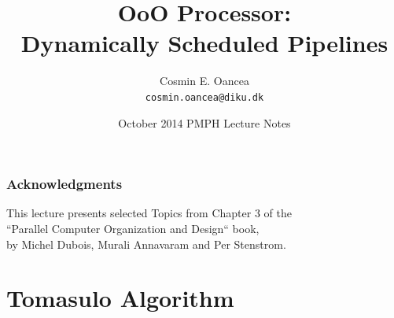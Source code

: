 \documentclass{beamer}
\title[OoO Processor]{OoO Processor:\\Dynamically Scheduled Pipelines}
\author[C.~Oancea]{Cosmin E. Oancea\\{\tt cosmin.oancea@diku.dk}}
\institute{Department of Computer Science (DIKU)\\University of Copenhagen}
\date[Sept 2014]{October 2014 PMPH Lecture Notes}
\begin{document}
\titleslide



\begin{frame}
\frametitle{Acknowledgments}
This lecture presents selected Topics from Chapter 3 of the\\
``Parallel Computer Organization and Design`` book,\\
by Michel Dubois, Murali Annavaram and Per Stenstrom.
\end{frame}

\begin{frame}[fragile]
	\tableofcontents
\end{frame}

\section{Tomasulo Algorithm}
\end{document}
